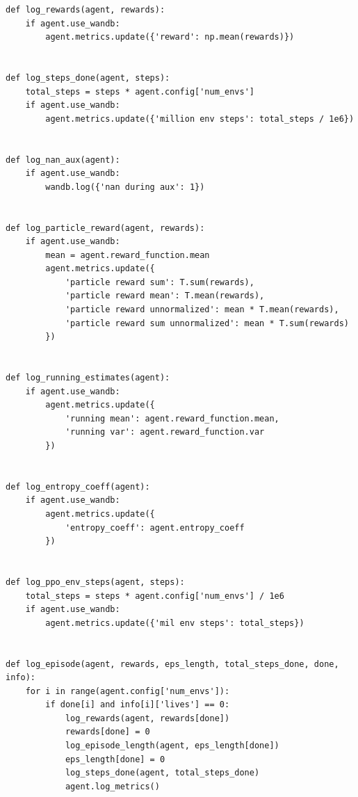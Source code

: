 \documentclass{article}
\begin{document}
\begin{lstlisting}
def log_rewards(agent, rewards):
    if agent.use_wandb:
        agent.metrics.update({'reward': np.mean(rewards)})


def log_steps_done(agent, steps):
    total_steps = steps * agent.config['num_envs']
    if agent.use_wandb:
        agent.metrics.update({'million env steps': total_steps / 1e6})


def log_nan_aux(agent):
    if agent.use_wandb:
        wandb.log({'nan during aux': 1})


def log_particle_reward(agent, rewards):
    if agent.use_wandb:
        mean = agent.reward_function.mean
        agent.metrics.update({
            'particle reward sum': T.sum(rewards),
            'particle reward mean': T.mean(rewards),
            'particle reward unnormalized': mean * T.mean(rewards),
            'particle reward sum unnormalized': mean * T.sum(rewards)
        })


def log_running_estimates(agent):
    if agent.use_wandb:
        agent.metrics.update({
            'running mean': agent.reward_function.mean,
            'running var': agent.reward_function.var
        })


def log_entropy_coeff(agent):
    if agent.use_wandb:
        agent.metrics.update({
            'entropy_coeff': agent.entropy_coeff
        })


def log_ppo_env_steps(agent, steps):
    total_steps = steps * agent.config['num_envs'] / 1e6
    if agent.use_wandb:
        agent.metrics.update({'mil env steps': total_steps})


def log_episode(agent, rewards, eps_length, total_steps_done, done, info):
    for i in range(agent.config['num_envs']):
        if done[i] and info[i]['lives'] == 0:
            log_rewards(agent, rewards[done])
            rewards[done] = 0
            log_episode_length(agent, eps_length[done])
            eps_length[done] = 0
            log_steps_done(agent, total_steps_done)
            agent.log_metrics()  
\end{lstlisting}
\newpage
\end{document}
